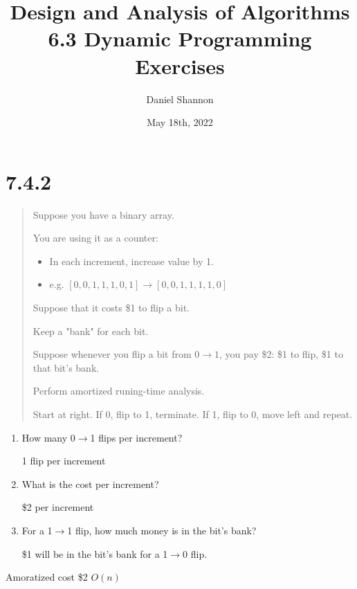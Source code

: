 \documentclass[12pt, letterpaper, twoside]{article}
\title{%
Design and Analysis of Algorithms\\
\large 6.3 Dynamic Programming Exercises
}
\author{Daniel Shannon}
\date{May 18th, 2022}
\begin{document}
\begin{titlepage}
\maketitle
\end{titlepage}
\section*{7.4.2}
\begin{quote}
    Suppose you have a binary array.

    You are using it as a counter:
    \begin{itemize}
        \item In each increment, increase value by 1.
        \item e.g. $[0,0,1,1,1,0,1]\rightarrow[0,0,1,1,1,1,0]$
    \end{itemize}
    Suppose that it costs \$1 to flip a bit. 
    
    Keep a "bank" for each bit.
    
    Suppose whenever you flip a bit from $0\rightarrow1$, you pay \$2: \$1 to flip, \$1 to that bit's bank.

    Perform amortized runing-time analysis.

    Start at right. If 0, flip to 1, terminate. If 1, flip to 0, move left and repeat.
    
\end{quote}
\begin{enumerate}
    \item How many 0$\rightarrow$1 flips per increment?
    
    1 flip per increment
    \item What is the cost per increment?
    
    \$2 per increment
    \item For a 1$\rightarrow$1 flip, how much money is in the bit's bank?
    
    \$1 will be in the bit's bank for a 1$\rightarrow$0 flip.
\end{enumerate}

Amoratized cost \$2 $O(n)$

\newpage
\end{document}
